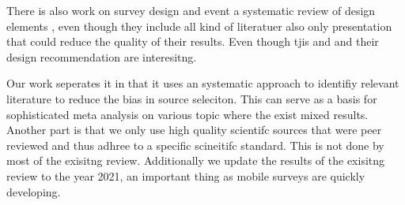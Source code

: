 There is also work on survey design and event a systematic review of design elements \cite{antoun_design_2018}, even though they include all kind of literatuer also only presentation that could reduce the quality of their results. Even though tjis and and their design recommendation are interesitng.


Our work seperates it in that it uses an systematic approach to identifiy relevant literature to reduce the bias in source seleciton. This can serve as a basis for sophisticated meta analysis on various topic where the exist mixed results. Another part is that we only use high quality scientifc sources that were peer reviewed and thus adhree to a specific scineitifc standard. This is not done by most of the exisitng review. Additionally we update the results of the exisitng review to the year 2021, an important thing as mobile surveys are quickly developing. 


